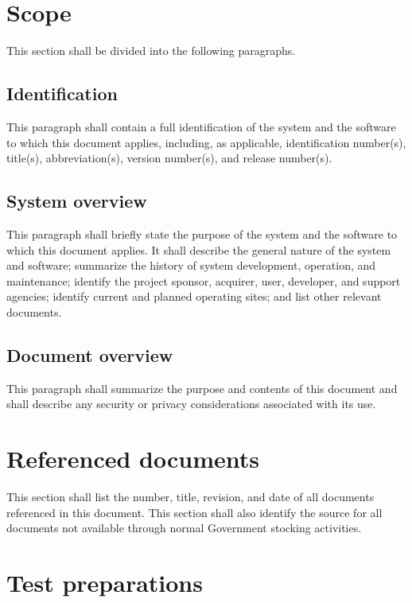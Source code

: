 \section{Scope}

This section shall be divided into the following paragraphs.

\subsection{Identification}

This paragraph shall contain a full identification of the system and the
software to which this document applies, including, as applicable,
identification number(s), title(s), abbreviation(s), version number(s),
and release number(s).

\subsection{System overview}

This paragraph shall briefly state the purpose of the system and the
software to which this document applies. It shall describe the general
nature of the system and software; summarize the history of system
development, operation, and maintenance; identify the project sponsor,
acquirer, user, developer, and support agencies; identify current and
planned operating sites; and list other relevant documents.

\subsection{Document overview}

This paragraph shall summarize the purpose and contents of this document
and shall describe any security or privacy considerations associated
with its use.

\section{Referenced documents}

This section shall list the number, title, revision, and date of all
documents referenced in this document. This section shall also identify
the source for all documents not available through normal Government
stocking activities.

\section{Test preparations}

